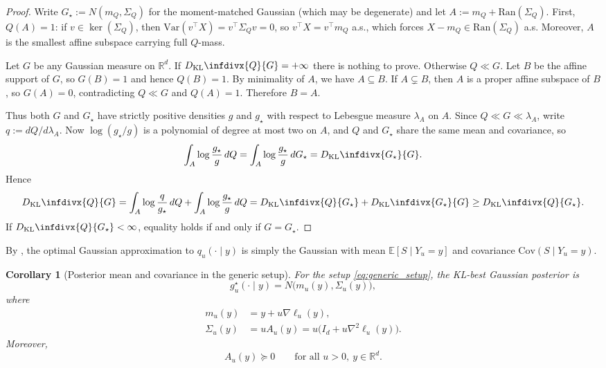 \documentclass[11pt]{article}
\def\E{\mathbb{E}}
\def\R{\mathbb{R}}
\newcommand{\kl}{D_{\mathrm{KL}}\infdivx}
\newcommand{\Cov}{\mathrm{Cov}}
\newtheorem{corollary}{Corollary}
\begin{document}
\begin{proof}
Write \(G_\star:=N(m_Q,\Sigma_Q)\) for the moment-matched Gaussian (which may be degenerate) and let \(A:=m_Q+\mathrm{Ran}(\Sigma_Q)\). First, \(Q(A)=1\): if \(v\in\ker(\Sigma_Q)\), then \(\mathrm{Var}(v^\top X)=v^\top\Sigma_Q v=0\), so \(v^\top X=v^\top m_Q\) a.s., which forces \(X-m_Q\in\mathrm{Ran}(\Sigma_Q)\) a.s. Moreover, \(A\) is the smallest affine subspace carrying full \(Q\)-mass.

Let \(G\) be any Gaussian measure on \(\R^d\). If \(\kl{Q}{G}=+\infty\) there is nothing to prove. Otherwise \(Q\ll G\). Let \(B\) be the affine support of \(G\), so \(G(B)=1\) and hence \(Q(B)=1\). By minimality of \(A\), we have \(A\subseteq B\). If \(A\subsetneq B\), then \(A\) is a proper affine subspace of \(B\), so \(G(A)=0\), contradicting \(Q\ll G\) and \(Q(A)=1\). Therefore \(B=A\).

Thus both \(G\) and \(G_\star\) have strictly positive densities \(g\) and \(g_\star\) with respect to Lebesgue measure \(\lambda_A\) on \(A\). Since \(Q\ll G\ll \lambda_A\), write \(q:=dQ/d\lambda_A\). Now \(\log(g_\star/g)\) is a polynomial of degree at most two on \(A\), and \(Q\) and \(G_\star\) share the same mean and covariance, so
\[
\int_A \log\frac{g_\star}{g}\,dQ
=
\int_A \log\frac{g_\star}{g}\,dG_\star
=
\kl{G_\star}{G}.
\]
Hence
\[
\kl{Q}{G}
=
\int_A \log\frac{q}{g_\star}\,dQ + \int_A \log\frac{g_\star}{g}\,dQ
=
\kl{Q}{G_\star} + \kl{G_\star}{G}
\ge
\kl{Q}{G_\star}.
\]
If \(\kl{Q}{G_\star}<\infty\), equality holds if and only if \(G=G_\star\).
\end{proof}

By , the optimal Gaussian approximation to \(q_u(\cdot\mid y)\) is simply the Gaussian with mean \(\E[S\mid Y_u=y]\) and covariance \(\Cov(S\mid Y_u=y)\).

\begin{corollary}[Posterior mean and covariance in the generic setup]
\label{cor:generic_posterior_mean_cov}
For the setup \eqref{eq:generic_setup}, the KL-best Gaussian posterior is
\[
g_u^\star(\cdot\mid y)=N\bigl(m_u(y),\Sigma_u(y)\bigr),
\]
where
\begin{align}
\label{eq:generic_posterior_mean}
m_u(y)
&= y + u\nabla \ell_u(y), \\
\label{eq:generic_posterior_cov}
\Sigma_u(y)
&= uA_u(y)=u\bigl(I_d + u\nabla^2 \ell_u(y)\bigr).
\end{align}
Moreover,
\[
A_u(y)\succeq 0
\qquad\text{for all }u>0,\ y\in\R^d.
\]
\end{corollary}
\end{document}
